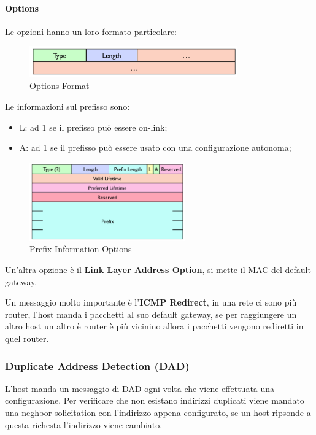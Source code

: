 \documentclass[12pt]{article}
\begin{document}
\paragraph{Options}
Le opzioni hanno un loro formato particolare:
\begin{figure}[H]
    \centering
    \includegraphics[width=0.8\textwidth]{options-format.png}
    \caption{Options Format}
    \label{fig:options-format}
\end{figure}
Le informazioni sul prefisso sono:
\begin{itemize}
    \item L: ad 1 se il prefisso pu\`o essere on-link;
    \item A: ad 1 se il prefisso pu\`o essere usato con una configurazione autonoma;
\end{itemize}
\begin{figure}[H]
    \centering
    \includegraphics[width=0.6\textwidth]{prefix-information-options.png}
    \caption{Prefix Information Options}
    \label{fig:prefix-information-options}
\end{figure}

Un'altra opzione \`e il \textbf{Link Layer Address Option}, si mette il MAC del default gateway.

Un messaggio molto importante \`e l'\textbf{ICMP Redirect}, in una rete ci sono pi\`u router, l'host manda i pacchetti al suo default gateway, se per raggiungere un altro host un altro \`e router \`e pi\`u vicinino allora i pacchetti vengono rediretti in quel router.

\subsubsection{Duplicate Address Detection (DAD)}
L'host manda un messaggio di DAD ogni volta che viene effettuata una configurazione. Per verificare che non esistano indirizzi duplicati viene mandato una neghbor solicitation con l'indirizzo appena configurato, se un host ripsonde a questa richesta l'indirizzo viene cambiato.
\end{document}
